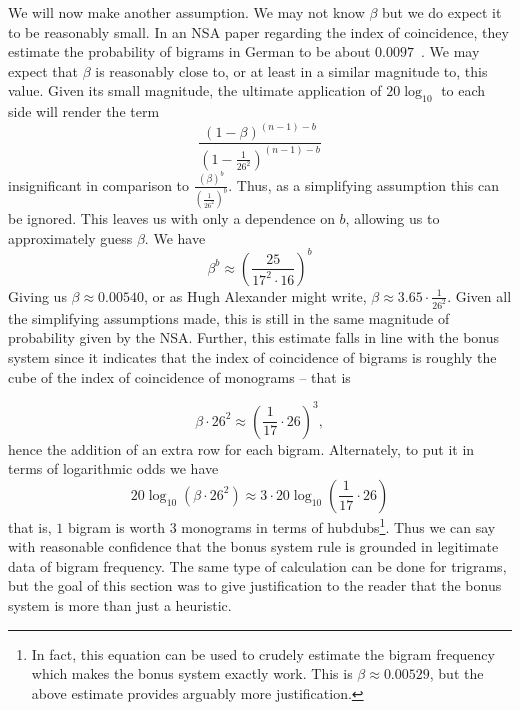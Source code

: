 
\noindent We will now make another assumption. We may not know
$\beta$ but we do expect it to be reasonably small. In an NSA paper
regarding the index of coincidence, they estimate the probability of
bigrams in German to be about $0.0097$~\cite[p.~4]{Friedman1944}. We may expect that $\beta$ is
reasonably close to, or at least in a similar magnitude to, this value.
Given its small magnitude, the ultimate application of
$20\log_{10}$ to each side will render the term
\[
  \frac{(1-\beta)^{(n-1)-b}}{(1-\frac{1}{26^2})^{(n-1)-b}}
\]
insignificant in comparison to
$\frac{(\beta)^b}{(\frac{1}{26^2})^b}$. Thus, as a simplifying
assumption this can be ignored.
This leaves us with only a dependence on $b$, allowing us to
approximately guess $\beta$. We have
\[
  \beta^b \approx
  (\frac{25}{17^2\cdot16})^b
\]
Giving us $\beta \approx 0.00540$, or as Hugh Alexander might
write, $\beta \approx 3.65\cdot\frac{1}{26^2}$. Given all the
simplifying assumptions made, this is still in the same magnitude
of probability given by the NSA. Further, this estimate falls in
line with the bonus system since it indicates that the index of
coincidence of bigrams is roughly the cube of the index of
coincidence of monograms -- that is

\[
  \beta\cdot26^2 \approx (\frac{1}{17}\cdot26)^3,
\]
hence the addition of an extra row for each bigram. Alternately, to
put it in terms of
logarithmic odds we have
\[
  20\log_{10}(\beta\cdot26^2) \approx 3\cdot20\log_{10}(\frac{1}{17}\cdot26)
\]
that is, $1$ bigram is worth $3$ monograms in terms of
hubdubs\footnote{In fact, this equation can be used to crudely
  estimate the bigram frequency which makes the bonus system exactly
  work. This is $\beta\approx0.00529$, but the above estimate
provides arguably more justification.}. Thus we can say with reasonable
confidence that the bonus system rule is grounded in legitimate
data of bigram frequency. The same type of calculation can be done
for trigrams, but the goal of this section was to give justification
to the reader that the bonus system is more than just a heuristic.

